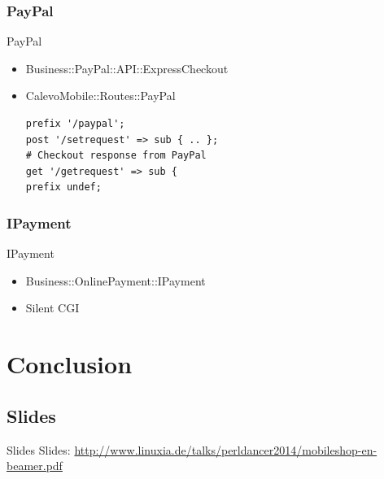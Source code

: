 \subsubsection{PayPal}
\begin{frame}[fragile]{PayPal}
\begin{itemize}
\item Business::PayPal::API::ExpressCheckout
\item CalevoMobile::Routes::PayPal
\begin{lstlisting}
prefix '/paypal';
post '/setrequest' => sub { .. };
# Checkout response from PayPal
get '/getrequest' => sub {
prefix undef;
\end{lstlisting}
\end{itemize}
\end{frame}

\subsubsection{IPayment}
\begin{frame}[fragile]{IPayment}
\begin{itemize}
\item Business::OnlinePayment::IPayment
\item Silent CGI
\end{itemize}
\end{frame}


\section{Conclusion}

\subsection{Slides}

\begin{frame}{Slides}
Slides:
\url{http://www.linuxia.de/talks/perldancer2014/mobileshop-en-beamer.pdf}
\end{frame}




